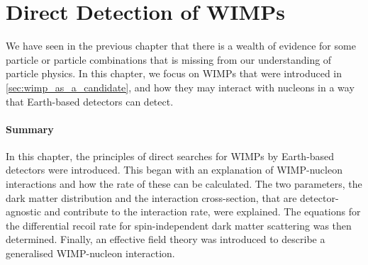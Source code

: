 \chapter{Direct Detection of WIMPs}
\label{chap:detection_theory}
\par
We have seen in the previous chapter that there is a wealth of evidence for some particle or particle combinations that is missing from our understanding of particle physics.
In this chapter, we focus on WIMPs that were introduced in \autoref{sec:wimp_as_a_candidate}, and how they may interact with nucleons in a way that Earth-based detectors can detect.






\subsubsection*{Summary}
\par
In this chapter, the principles of direct searches for WIMPs by Earth-based detectors were introduced.
This began with an explanation of WIMP-nucleon interactions and how the rate of these can be calculated.
The two parameters, the dark matter distribution and the interaction cross-section, that are detector-agnostic and contribute to the interaction rate, were explained.
The equations for the differential recoil rate for spin-independent dark matter scattering was then determined.
Finally, an effective field theory was introduced to describe a generalised WIMP-nucleon interaction.


